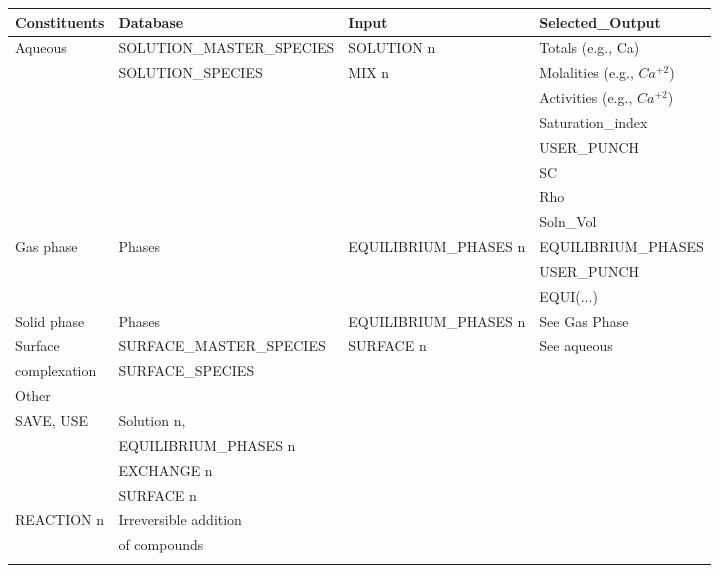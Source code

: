 \begin{table}[h]
\centering
\footnotesize
\begin{tabular}{llll}
\toprule
Constituents	& Database	                & Input	     & Selected\_Output   \\ \hline
Aqueous       &	SOLUTION\_MASTER\_SPECIES & SOLUTION n & Totals (e.g., Ca)   \\
              & SOLUTION\_SPECIES	        & MIX n      & Molalities (e.g., $Ca^{+2}$) \\
              &                           &            & Activities (e.g., $Ca^{+2}$) \\
              &                           &            & Saturation\_index  \\
              &                           &            & USER\_PUNCH       \\
              &                           &            &        SC         \\
              &                           &            &     Rho           \\
              &                           &            &   Soln\_Vol        \\ \hline
Gas phase	    & Phases	   & EQUILIBRIUM\_PHASES n   & EQUILIBRIUM\_PHASES \\
              &            &                         & USER\_PUNCH   \\
              &            &                         & EQUI(...)     \\ \hline
Solid phase	  & Phases     & EQUILIBRIUM\_PHASES n   & See Gas Phase \\ \hline
Surface       & SURFACE\_MASTER\_SPECIES & SURFACE n & See aqueous   \\
complexation  & SURFACE\_SPECIES         &           &       \\ \hline
Other         &                          &           &       \\ \hline
SAVE, USE	    & Solution n,              &           &       \\
              & EQUILIBRIUM\_PHASES n    &           &       \\ 
							& EXCHANGE  n              &           &       \\ 
							& SURFACE n                &           &       \\ \hline
REACTION n    &	Irreversible addition    &           &       \\
              & of compounds             &           &       \\ 

\bottomrule
\label{tab:keywords}
\end{tabular}
\end{table}	

